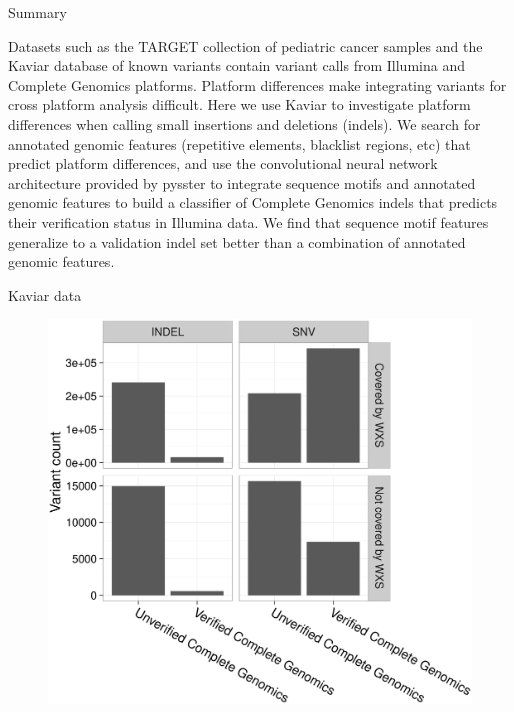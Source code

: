 \begin{column}{\onecolwid} %



\begin{block}{Summary}

Datasets such as the TARGET collection of pediatric cancer samples and the Kaviar database of known variants contain variant calls from Illumina and Complete Genomics platforms. Platform differences make integrating variants for cross platform analysis difficult. Here we use Kaviar to investigate platform differences when calling small insertions and deletions (indels). We search for annotated genomic features (repetitive elements, blacklist regions, etc) that predict platform differences, and use the convolutional neural network architecture provided by pysster \cite{budach2018pysster} to integrate sequence motifs and annotated genomic features to build a classifier of Complete Genomics indels that predicts their verification status in Illumina data. We find that sequence motif features generalize to a validation indel set better than a combination of annotated genomic features.

\end{block}

\begin{block}{Kaviar data}


\begin{figure}
\includegraphics[width=1\linewidth]{figs/init_counts.eps}
\end{figure}


\end{block}
\end{column}
